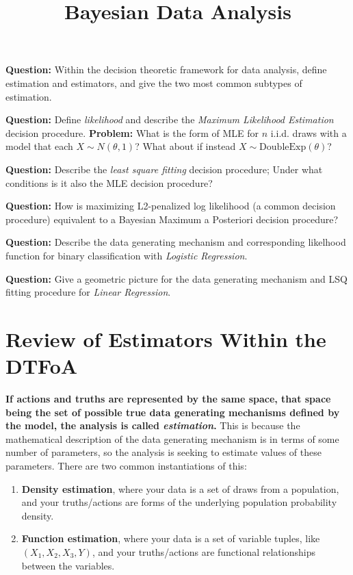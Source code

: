 




\title{Bayesian Data Analysis}
\date{}
\maketitle

\textbf{Question:} Within the decision theoretic framework for data analysis, define estimation and estimators, and give the two most common subtypes of estimation.
\nn

\textbf{Question:} Define \emph{likelihood} and describe the \emph{Maximum Likelihood Estimation} decision procedure.
\n
\textbf{Problem:} What is the form of MLE for $n$ i.i.d. draws with a model that each $X \sim N(\theta, 1)$? What about if instead $X \sim \mathrm{DoubleExp}(\theta)$?
\nn

\textbf{Question:} Describe the \emph{least square fitting} decision procedure; Under what conditions is it also the MLE decision procedure?
\n

\textbf{Question:} How is maximizing L2-penalized log likelihood (a common decision procedure) equivalent to a Bayesian Maximum a Posteriori decision procedure?
\n

\textbf{Question:} Describe the data generating mechanism and corresponding likelhood function for binary classification with \emph{Logistic Regression}.

\textbf{Question:} Give a geometric picture for the data generating mechanism and LSQ fitting procedure for \emph{Linear Regression}.

\vspace{.3 in}
\tableofcontents

\section{Review of Estimators Within the DTFoA}
\textbf{If actions and  truths are represented by the same space, that space being the set of possible true data generating mechanisms defined by the model, the analysis is called \emph{estimation}.}  This is because the mathematical description of the data generating mechanism is in terms of some number of parameters, so the analysis is seeking to estimate values of these parameters. There are two common instantiations of this:
\begin{enumerate}
\item \textbf{Density estimation}, where your data is a set of draws from a population, and your truths/actions are forms of the underlying population probability density.
\item \textbf{Function estimation}, where your data is a set of variable tuples, like $(X_1, X_2, X_3, Y)$, and your truths/actions are functional relationships between the variables.
\end{enumerate}

